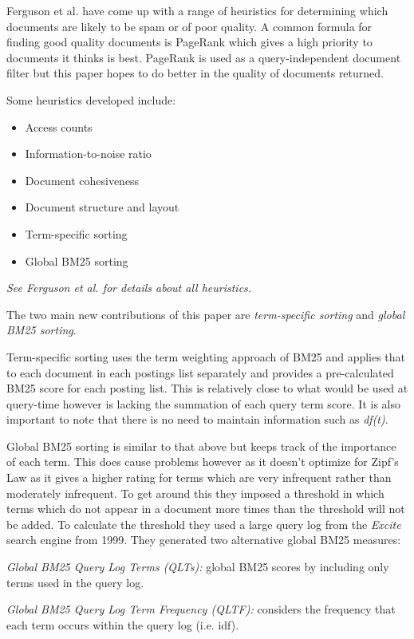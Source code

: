 \documentclass{acm_proc_article-sp}
\begin{document}
Ferguson et al. have come up with a range of heuristics for determining which documents are likely to be spam or of poor quality. A common formula for finding good quality documents is PageRank which gives a high priority to documents it thinks is best. PageRank is used as a query-independent document filter but this paper hopes to do better in the quality of documents returned.

Some heuristics developed include:
\begin{itemize}
\item Access counts
\item Information-to-noise ratio
\item Document cohesiveness
\item Document structure and layout
\item Term-specific sorting
\item Global BM25 sorting
\end{itemize}
\emph{See Ferguson et al. \cite{Ferguson:2012} for details about all heuristics.}

The two main new contributions of this paper are \emph{term-specific sorting} and \emph{global BM25 sorting}.

Term-specific sorting uses the term weighting approach of BM25 and applies that to each document in each postings list separately and provides a pre-calculated BM25 score for each posting list. This is relatively close to what would be used at query-time however is lacking the summation of each query term score. It is also important to note that there is no need to maintain information such as \emph{df(t)}.

Global BM25 sorting is similar to that above but keeps track of the importance of each term. This does cause problems however as it doesn't optimize for Zipf's Law as it gives a higher rating for terms which are very infrequent rather than moderately infrequent. To get around this they imposed a threshold in which terms which do not appear in a document more times than the threshold will not be added. To calculate the threshold they used a large query log from the \emph{Excite} search engine from 1999. They generated two alternative global BM25 measures:
 
\emph{Global BM25 Query Log Terms (QLTs):} global BM25 scores by including only terms used in the query log.

\emph{Global BM25 Query Log Term Frequency (QLTF):} considers the frequency that each term occurs within the query log (i.e. idf).
\end{document}
